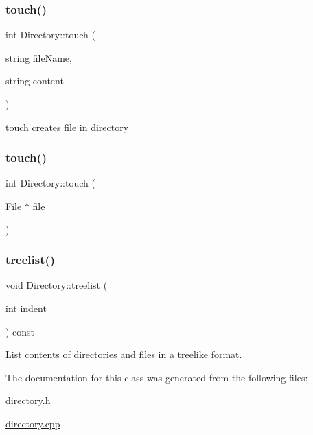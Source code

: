 \mbox{\label{class_directory_abe82fee2bf7d59d277133848d8c9833d}} 
\subsubsection{\texorpdfstring{touch()}{touch()}\hspace{0.1cm}{\footnotesize\ttfamily [1/2]}}
{\footnotesize\ttfamily int Directory\+::touch (\begin{DoxyParamCaption}\item[{string}]{file\+Name,  }\item[{string}]{content }\end{DoxyParamCaption})}



touch creates file in directory 

\mbox{\label{class_directory_ab78fbd1a38c3e9f3926372f9fb2ccf5e}} 
\subsubsection{\texorpdfstring{touch()}{touch()}\hspace{0.1cm}{\footnotesize\ttfamily [2/2]}}
{\footnotesize\ttfamily int Directory\+::touch (\begin{DoxyParamCaption}\item[{\hyperlink{class_file}{File} $\ast$}]{file }\end{DoxyParamCaption})}

\mbox{\label{class_directory_af21c038562a88b24df0cb6e0c361febd}} 
\subsubsection{\texorpdfstring{treelist()}{treelist()}}
{\footnotesize\ttfamily void Directory\+::treelist (\begin{DoxyParamCaption}\item[{int}]{indent }\end{DoxyParamCaption}) const}



List contents of directories and files in a treelike format. 



The documentation for this class was generated from the following files\+:\begin{DoxyCompactItemize}
\item 
\hyperlink{directory_8h}{directory.\+h}\item 
\hyperlink{directory_8cpp}{directory.\+cpp}\end{DoxyCompactItemize}
